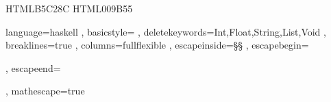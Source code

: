\usepackage{xcolor}
\definecolor{YellowGreen} {HTML}{B5C28C}
\definecolor{ForestGreen} {HTML}{009B55}


\usepackage{xltxtra} %
\usepackage{polyglossia}
\setmainlanguage{russian}

\let\cyrillicfonttt\monofamily
\newfontfamily{}
\newfontfamily{} 

\usepackage{listings}
         { language=haskell
         , basicstyle=\monacoB
         , deletekeywords={Int,Float,String,List,Void}
         , breaklines=true
         , columns=fullflexible
         , escapeinside=§§
         , escapebegin=\begin{russian}\monacoB\color{ForestGreen}
         , escapeend=\end{russian}
         , mathescape=true
}

